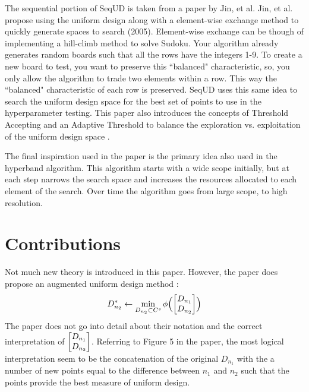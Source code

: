 \documentclass[twoside,11pt]{article}
\begin{document}
The sequential portion of SeqUD is taken from a paper by Jin, et al. Jin, et al. propose using the uniform design along with a element-wise exchange method to quickly generate spaces to search (2005). Element-wise exchange can be though of implementing a hill-climb method to solve Sudoku. Your algorithm already generates random boards such that all the rows have the integers 1-9. To create a new board to test, you want to preserve this ``balanced" characteristic, so, you only allow the algorithm to trade two elements within a row. This way the ``balanced" characteristic of each row is preserved. SeqUD uses this same idea to search the uniform design space for the best set of points to use in the hyperparameter testing. This paper also introduces the concepts of Threshold Accepting and an Adaptive Threshold to balance the exploration vs. exploitation of the uniform design space \citep{jin_chen_sudjianto_2005}. 

The final inspiration used in the paper is the primary idea also used in the hyperband algorithm. This algorithm starts with a wide scope initially, but at each step narrows the search space and increases the resources allocated to each element of the search. Over time the algorithm goes from large scope, to high resolution. 

\section{Contributions}
Not much new theory is introduced in this paper. However, the paper does propose an augmented uniform design method \citep{yang2021hyperparameter}: 
\[D_{n_2}^* \leftarrow \min_{D_{n_2}\subset C^s}\phi \Big(\mqty[D_{n_1} \\ D_{n_2}]\Big)\]
The paper does not go into detail about their notation and the correct interpretation of $\mqty[D_{n_1} \\ D_{n_2}]$. Referring to Figure 5 in the paper, the most logical interpretation seem to be the concatenation of the original $D_{n_1}$ with the a number of new points equal to the difference between $n_1$ and $n_2$ such that the points provide the best measure of uniform design. 
\end{document}
